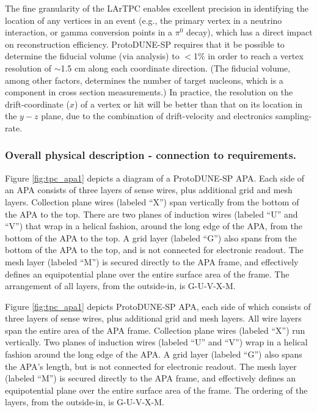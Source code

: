 The fine granularity of the LArTPC enables excellent precision in identifying the location of any vertices in an event (e.g., the primary vertex in a neutrino interaction, or gamma conversion points in a $\pi^{0}$ decay), which has a direct impact on reconstruction efficiency. ProtoDUNE-SP requires that it be possible to determine the fiducial volume (via analysis) to $<$1$\%$ in order to reach a vertex resolution of $\sim$1.5 cm along each coordinate direction. (The fiducial volume, among other factors, determines the number of target nucleons, which is a component in cross section measurements.) In practice, the resolution on the drift-coordinate ($x$) of a vertex or hit will be better than that on its location in the $y-z$ plane, due to the combination of drift-velocity and electronics sampling-rate.


\subsubsection{Overall physical description - connection to requirements.}

Figure \ref{fig:tpc_apa1} depicts a diagram of a ProtoDUNE-SP APA.  Each side of an APA consists of three layers of sense wires, plus additional grid and mesh layers.  Collection plane wires (labeled ``X'') span vertically from the bottom of the APA to the top.  There are two planes of induction wires (labeled ``U'' and ``V'') that wrap in a helical fashion, around the long edge of the APA, from the bottom of the APA to the top.  A grid layer (labeled ``G'') also spans from the bottom of the APA to the top, and is not connected for electronic readout.  The mesh layer (labeled ``M'') is secured directly to the APA frame, and effectively defines an equipotential plane over the entire surface area of the frame.  The arrangement of all layers, from the outside-in, is G-U-V-X-M. 

Figure \ref{fig:tpc_apa1} depicts ProtoDUNE-SP APA, each  side of which consists of three layers of sense wires, plus additional grid and mesh layers.  All wire layers span the entire area of the APA frame. Collection plane wires (labeled ``X'') run vertically.  Two planes of induction wires (labeled ``U'' and ``V'') wrap in a helical fashion around the long edge of the APA.  A grid layer (labeled ``G'') also spans the APA's length, but is not connected for electronic readout.  The mesh layer (labeled ``M'') is secured directly to the APA frame, and effectively defines an equipotential plane over the entire surface area of the frame.  The ordering of the layers, from the outside-in, is G-U-V-X-M. 

